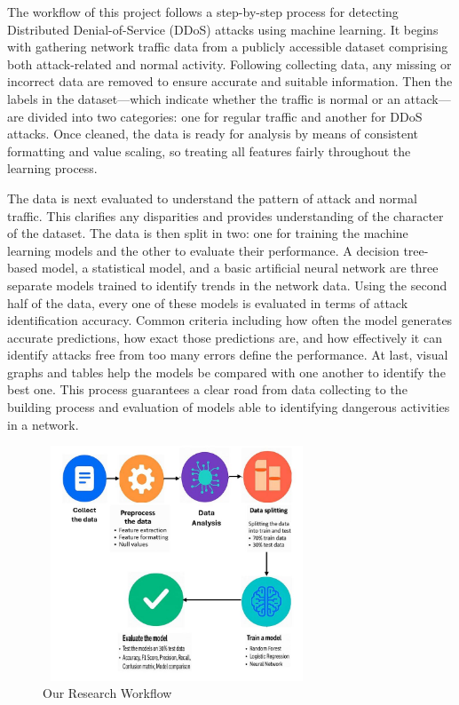 \documentclass[conference]{IEEEtran}
\begin{document}
The workflow of this project follows a step-by-step process for detecting Distributed Denial-of-Service (DDoS) attacks using machine learning. It begins with gathering network traffic data from a publicly accessible dataset comprising both attack-related and normal activity. Following collecting data, any missing or incorrect data are removed to ensure accurate and suitable information. Then the labels in the dataset—which indicate whether the traffic is normal or an attack—are divided into two categories: one for regular traffic and another for DDoS attacks. Once cleaned, the data is ready for analysis by means of consistent formatting and value scaling, so treating all features fairly throughout the learning process.

The data is next evaluated to understand the pattern of attack and normal traffic. This clarifies any disparities and provides understanding of the character of the dataset. The data is then split in two: one for training the machine learning models and the other to evaluate their performance. A decision tree-based model, a statistical model, and a basic artificial neural network are three separate models trained to identify trends in the network data. Using the second half of the data, every one of these models is evaluated in terms of attack identification accuracy. Common criteria including how often the model generates accurate predictions, how exact those predictions are, and how effectively it can identify attacks free from too many errors define the performance. At last, visual graphs and tables help the models be compared with one another to identify the best one. This process guarantees a clear road from data collecting to the building process and evaluation of models able to identifying dangerous activities in a network.

\begin{figure}
\centering
\includegraphics[height=7cm,width=8cm]{Flowchart.JPG}
\caption{Our Research Workflow} 
\label{fig:Our Research Workflow}
\end{figure}
\end{document}
